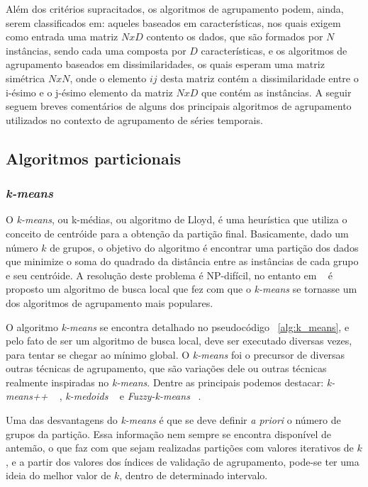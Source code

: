 Além dos critérios supracitados, os algoritmos de agrupamento podem, ainda, serem classificados em: aqueles baseados em características, nos quais exigem como entrada uma matriz $NxD$ contento os dados, que são formados por $N$ instâncias, sendo cada uma composta por $D$ características, e os algoritmos de agrupamento baseados em dissimilaridades, os quais esperam uma matriz simétrica $NxN$, onde o elemento $ij$ desta matriz contém a dissimilaridade entre o i-ésimo e o j-ésimo elemento da matriz $NxD$ que contém as instâncias. A seguir seguem breves comentários de alguns dos principais algoritmos de agrupamento utilizados no contexto de agrupamento de séries temporais.

\subsection{Algoritmos particionais}

\subsubsection{\emph{k-means}}

O \emph{k-means}, ou k-médias, ou algoritmo de Lloyd, é uma heurística que utiliza o conceito de centróide para a obtenção da partição final. Basicamente, dado um número $k$ de grupos, o objetivo do algoritmo é encontrar uma partição dos dados que minimize o soma do quadrado da distância entre as instâncias de cada grupo e seu centróide. A resolução deste problema é NP-difícil, no entanto em ~\parencite{Lloyd} é proposto um algoritmo de busca local que fez com que o \emph{k-means} se tornasse um dos algoritmos de agrupamento mais populares.

O algoritmo \emph{k-means} se encontra detalhado no pseudocódigo ~\ref{alg:k_means}, e pelo fato de ser um algoritmo de busca local, deve ser executado diversas vezes, para tentar se chegar ao mínimo global. O \emph{k-means} foi o precursor de diversas outras técnicas de agrupamento, que são variações dele ou outras técnicas realmente inspiradas no \emph{k-means}. Dentre as principais podemos destacar: \emph{k-means++} ~\parencite{k-means++} , \emph{k-medoids} ~\parencite{k-medoids} e \emph{Fuzzy-k-means } ~\parencite{fuzzy_k-means}.

Uma das desvantagens do \emph{k-means} é que se deve definir \emph{a priori} o número de grupos da partição. Essa informação nem sempre se encontra disponível de antemão, o que faz com que sejam realizadas partições com valores iterativos de $k$, e a partir dos valores dos índices de validação de agrupamento, pode-se ter uma ideia do melhor valor de $k$, dentro de determinado intervalo.

